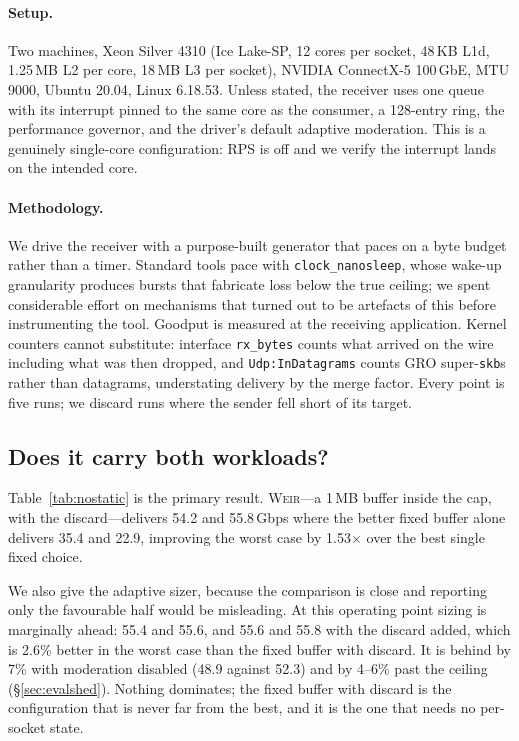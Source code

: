 \documentclass[letterpaper,twocolumn,10pt]{article}
\newcommand{\sys}{\textsc{Weir}\xspace}
\begin{document}
\paragraph{Setup.} Two machines, Xeon Silver 4310 (Ice Lake-SP, 12 cores per
socket, 48\,KB L1d, 1.25\,MB L2 per core, 18\,MB L3 per socket), NVIDIA
ConnectX-5 100\,GbE, MTU 9000, Ubuntu 20.04, Linux 6.18.53. Unless stated, the
receiver uses one queue with its interrupt pinned to the same core as the
consumer, a 128-entry ring, the performance governor, and the driver's default
adaptive moderation. This is a genuinely single-core configuration: RPS is off
and we verify the interrupt lands on the intended core.

\paragraph{Methodology.} We drive the receiver with a purpose-built generator
that paces on a byte budget rather than a timer. Standard tools pace with
\texttt{clock\_nanosleep}, whose wake-up granularity produces bursts that
fabricate loss below the true ceiling; we spent considerable effort on
mechanisms that turned out to be artefacts of this before instrumenting the
tool. Goodput is measured at the receiving application. Kernel counters cannot
substitute: interface \texttt{rx\_bytes} counts what arrived on the wire
including what was then dropped, and \texttt{Udp:InDatagrams} counts GRO
super-\texttt{skb}s rather than datagrams, understating delivery by the merge
factor. Every point is five runs; we discard runs where the sender fell short of
its target.

\subsection{Does it carry both workloads?}
\label{sec:evalworkloads}

Table~\ref{tab:nostatic} is the primary result. \sys---a 1\,MB buffer inside
the cap, with the discard---delivers 54.2 and 55.8\,Gbps where the better fixed
buffer alone delivers 35.4 and 22.9, improving the worst case by 1.53$\times$
over the best single fixed choice.

We also give the adaptive sizer, because the comparison is close and reporting
only the favourable half would be misleading. At this operating point sizing is
marginally ahead: 55.4 and 55.6, and 55.6 and 55.8 with the discard added, which
is 2.6\% better in the worst case than the fixed buffer with discard. It is
behind by 7\% with moderation disabled (48.9 against 52.3) and by 4--6\% past
the ceiling (\S\ref{sec:evalshed}). Nothing dominates; the fixed buffer with
discard is the configuration that is never far from the best, and it is the one
that needs no per-socket state.
\end{document}
